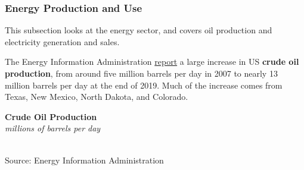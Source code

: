 \documentclass{report}
\makeatletter
\newcommand{\tbllink}[1]{\href{https://raw.githubusercontent.com/bdecon/US-chartbook/master/chartbook/data/#1}{\faTable}}
\newcommand*\short[1]{\expandafter\@gobbletwo\number\numexpr#1\relax}
\newcommand{\abar}[4]{
		\addplot[stack plots=y, area style, draw=none, fill=#1] 
			table [x=#2, y=#3, col sep=comma]{#4}\closedcycle;}
\newcommand{\dateaxisticks}{
		date coordinates in=x, axis line style={draw=none},
		xmax={2022-10-31},
		max space between ticks=40,	    
		xtick={{1990-01-01}, {1992-01-01}, {1994-01-01}, 
			{1996-01-01}, {1998-01-01}, {2000-01-01}, 
			{2002-01-01}, {2004-01-01}, {2006-01-01},
			{2008-01-01}, {2010-01-01}, {2012-01-01}, {2014-01-01},
		    {2016-01-01}, {2018-01-01}, {2020-01-01}, {2022-01-01}, 
		    {2024-01-01}, {2026-01-01}},
		minor xtick={{1989-01-01}, {1991-01-01}, {1993-01-01},
			{1995-01-01}, {1997-01-01}, {1999-01-01}, 
			{2001-01-01}, {2003-01-01}, {2005-01-01}, {2007-01-01},
		    {2009-01-01}, {2011-01-01}, {2013-01-01}, {2015-01-01},
		    {2017-01-01}, {2019-01-01}, {2021-01-01}, {2023-01-01}, 
		    {2025-01-01}, {2027-01-01}},
		enlarge y limits={0.06}, enlarge x limits={0.01},
		}
\newcommand{\rbars}{
		\fill[color=black!10] (axis cs:{1990-07-01},\pgfkeysvalueof{/pgfplots/ymin}) rectangle 
			(axis cs:{1991-03-01}, \pgfkeysvalueof{/pgfplots/ymax});
		\fill[color=black!10] (axis cs:{2007-12-01},\pgfkeysvalueof{/pgfplots/ymin}) rectangle 
			(axis cs:{2009-07-01}, \pgfkeysvalueof{/pgfplots/ymax});
		\fill[color=black!10] (axis cs:{2001-03-01},\pgfkeysvalueof{/pgfplots/ymin}) rectangle 
			(axis cs:{2001-11-01}, \pgfkeysvalueof{/pgfplots/ymax});
		\fill[color=black!10] (axis cs:{2020-02-01},\pgfkeysvalueof{/pgfplots/ymin}) rectangle 
			(axis cs:{2020-05-01}, \pgfkeysvalueof{/pgfplots/ymax});}
\makeatother
\begin{document}
{\subsubsection*{Energy Production and Use}
\begin{minipage}{0.76\textwidth}
\small This subsection looks at the energy sector, and covers oil production and electricity generation and sales. 

The Energy Information Administration \href{https://www.eia.gov/dnav/pet/pet_crd_crpdn_adc_mbblpd_m.htm}{report} a large increase in US \textbf{crude oil production}, from around five million barrels per day in 2007 to nearly 13 million barrels per day at the end of 2019. Much of the increase comes from Texas, New Mexico, North Dakota, and Colorado. 
\vspace{1mm}

\normalsize \textbf{Crude Oil Production}\\
\footnotesize{\textit{millions of barrels per day}}\\
\hspace*{-2mm} \\
\footnotesize{Source: Energy Information Administration} \hfill \tbllink{oil_prod.csv}
\vspace{8mm}

\small 
\end{minipage}
\vspace{2mm}

}
\end{document}
